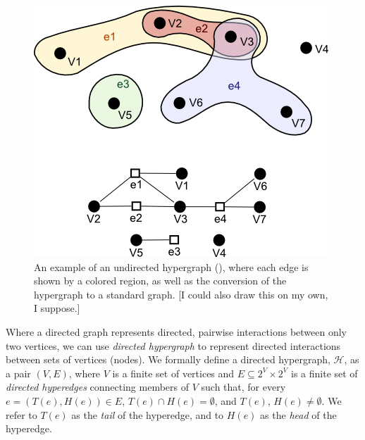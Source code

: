 \documentclass[12pt,twoside]{reedthesis}
\newcommand{\new}[2]{{\color{purple}#1 [#2]}}
\theoremstyle{definition}
\begin{document}
\begin{figure}[thbp]
  \begin{center}
    \includegraphics[width=\textwidth/2]{undirected_hypergraph}
  \caption[An example undirected hypergraph]{\new{An example of an undirected hypergraph (\cite{sharpen}), where each edge is shown by a colored region, as well as the conversion of the hypergraph to a standard graph.}{I could also draw this on my own, I suppose.}}
  \label{fig:undirected_hypergraph}
  \end{center}
\end{figure}

Where a directed graph represents directed, pairwise interactions between only two vertices, we can use \textit{directed hypergraph} to represent directed interactions between sets of vertices (nodes). We formally define a directed hypergraph, $\mathcal{H}$, as a pair $(V,E)$, where $V$ is a finite set of vertices and $E \subseteq 2^V \times 2^V$ is a finite set of \textit{directed hyperedges} connecting members of $V$ such that, for every $e=(T(e),H(e)) \in E$, $T(e) \cap H(e) = \emptyset$, and $T(e)$, $H(e) \neq \emptyset$.  We refer to $T(e)$ as the \textit{tail} of the hyperedge, and to $H(e)$ as the \textit{head} of the hyperedge.\par
\end{document}

